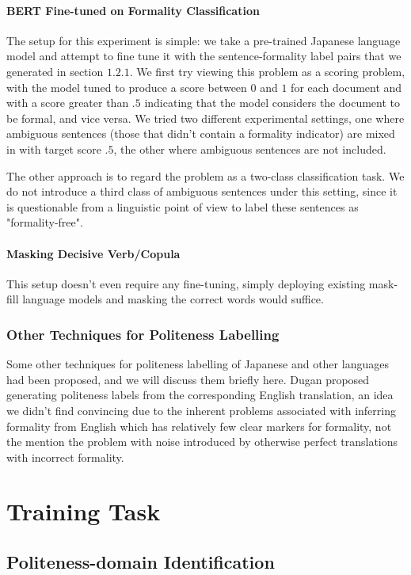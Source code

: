 \documentclass[11pt]{article}
\begin{document}
\paragraph{BERT Fine-tuned on Formality Classification}

The setup for this experiment is simple: we take a pre-trained Japanese language model and attempt to fine tune it with the sentence-formality label pairs that we generated in section $1.2.1$. We first try viewing this problem as a scoring problem, with the model tuned to produce a score between $0$ and $1$ for each document and with a score greater than $.5$ indicating that the model considers the document to be formal, and vice versa. We tried two different experimental settings, one where ambiguous sentences (those that didn't contain a formality indicator) are mixed in with target score $.5$, the other where ambiguous sentences are not included.

The other approach is to regard the problem as a two-class classification task. We do not introduce a third class of ambiguous sentences under this setting, since it is questionable from a linguistic point of view to label these sentences as "formality-free".

\paragraph{Masking Decisive Verb/Copula}

This setup doesn't even require any fine-tuning, simply deploying existing mask-fill language models and masking the correct words would suffice. 

\subsubsection{Other Techniques for Politeness Labelling}

Some other techniques for politeness labelling of Japanese and other languages had been proposed, and we will discuss them briefly here. Dugan \cite{Dugan:20} proposed generating politeness labels from the corresponding English translation, an idea we didn't find convincing due to the inherent problems associated with inferring formality from English which has relatively few clear markers for formality, not the mention the problem with noise introduced by otherwise perfect translations with incorrect formality.

\section{Training Task}

\subsection{Politeness-domain Identification}

\newpage
\printbibliography
\end{document}
